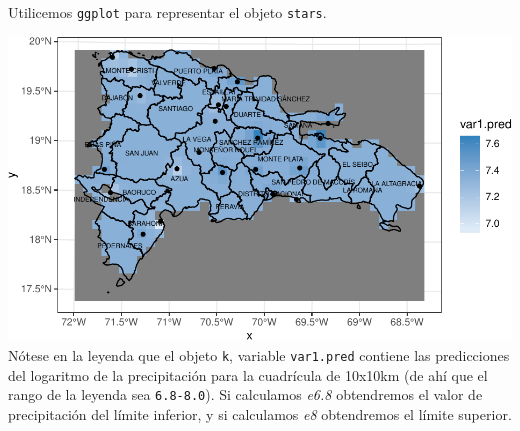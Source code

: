 \documentclass[11pt,]{article}
\newenvironment{Shaded}{\begin{snugshade}}{\end{snugshade}}
\newcommand{\KeywordTok}[1]{\textcolor[rgb]{0.13,0.29,0.53}{\textbf{#1}}}
\newcommand{\DataTypeTok}[1]{\textcolor[rgb]{0.13,0.29,0.53}{#1}}
\newcommand{\DecValTok}[1]{\textcolor[rgb]{0.00,0.00,0.81}{#1}}
\newcommand{\StringTok}[1]{\textcolor[rgb]{0.31,0.60,0.02}{#1}}
\newcommand{\OperatorTok}[1]{\textcolor[rgb]{0.81,0.36,0.00}{\textbf{#1}}}
\newcommand{\NormalTok}[1]{#1}
\begin{document}
Utilicemos \texttt{ggplot} para representar el objeto \texttt{stars}.

\begin{Shaded}
\end{Shaded}

\includegraphics{proyecto_files/figure-latex/krige-log-1.pdf} Nótese en
la leyenda que el objeto \texttt{k}, variable \texttt{var1.pred}
contiene las predicciones del logaritmo de la precipitación para la
cuadrícula de 10x10km (de ahí que el rango de la leyenda sea
\texttt{6.8-8.0}). Si calculamos \emph{e6.8} obtendremos el valor de
precipitación del límite inferior, y si calculamos \emph{e8} obtendremos
el límite superior.
\end{document}
